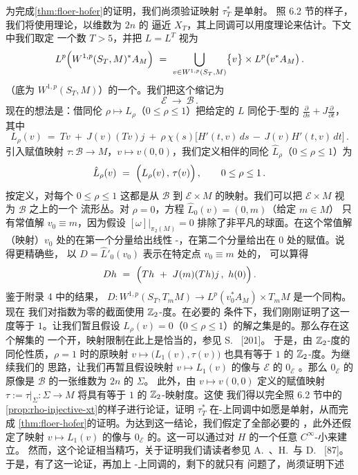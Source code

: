 为完成\cref{thm:floer-hofer}的证明，我们尚须验证映射 $\tau_{T}^{*}$ 是单射。%
照 6.2 节的样子，我们将使用\trFredholm{}理论，以维数为 $2n$ 的\trSmooth%
\trCompact\trManifold{}逼近 $X_{T}$，其上同调可以用度理论来估计。下文中我们取定%
一个数 $T>5$，并把\trOperator{} $L=L^{T}$ 视为\trBundle
\[
L^{p}\Bigl(W^{1,p}(S_{T},M)^{*}A_{M}\Bigr)\ =\ \bigcup_{v\in W^{1,p}(S_{T},M)}\bigl\{v\bigr\}\times L^{p}\bigl(v^{*}A_{M}\bigr)\,.
\]
（底为 $W^{1,p}(S_{T},M)$）的一个\trSmooth\trSection。我们把这个\trBundle{}缩记为
\[
\mathcal{E}\ \to\ \mathcal{B}\,.
\]
现在的想法是：借同伦 $\rho\mapsto L_{\rho}$（$0\leq\rho\leq1$）把给定的%
\trSection{} $L$ 同伦于\trCauchy-\trRiemann{}型的\trSection{}%
$\frac{\partial}{\partial s}+J\frac{\partial}{\partial t}$，其中
\[
L_{\rho}(v)\ =\ Tv\ +\ J(v)(Tv)j\ +\ \rho\,\chi(s)\bigl[H'(t,v)\,ds\,-\,J(v)H'(t,v)\,dt\bigr]\,.
\]
引入赋值映射 $\tau:\mathcal{B}\to M$，$v\mapsto v(0,0)$，我们定义相伴的同伦%
$\hat{L}_{\rho}$（$0\leq\rho\leq1$）为
\[
\hat{L}_{\rho}(v)\ =\ \Bigl(L_{\rho}(v)\,,\,\tau(v)\Bigr)\,,\qquad 0\leq\rho\leq1\,.
\]
按定义，对每个 $0\leq\rho\leq1$ 这都是从 $\mathcal{B}$ 到 $\mathcal{E}\times M$%
的映射。我们可以把 $\mathcal{E}\times M$ 视为 $\mathcal{B}$ 之上的一个%
\trBanach{}流形丛。对 $\rho=0$，方程 $\hat{L}_{0}(v)=(0,m)$（给定 $m\in M$）%
只有常值解 $v_{0}\equiv m$，因为假设 $[\omega]\big|_{\pi_{2}(M)}=0$%
排除了非平凡的\trHolomorphic{}球面。在这个常值解%
（映射）$v_{0}$ 处的\trLinearization{}在第一个分量给出线性%
\trCauchy-\trRiemann\trOperator，在第二个分量给出在 $0$ 处的赋值。说得更精确些，%
以 $D=\hat{L}'_{0}(v_{0})$ 表示在特定点 $v_{0}\equiv m$ 处的\trLinearization，%
可以算得
\[
Dh\ =\ \Bigl(Th\ +\ J(m)(Th)j\,,\ h(0)\Bigr)\,.
\]
鉴于附录 4 中的结果，\trOperator{}%
$D:W^{1,p}(S_{T},T_{m}M)\to L^{p}(v_{0}^{*}A_{M})\times T_{m}M$ 是一个同构。现在%
我们对\trFredholm{}指数为零的\trFredholm{}截面使用 $\mathbb{Z}_{2}$-度。在必要的%
\trCompactness{}条件下，我们刚刚证明了这一度等于 $1$。让我们暂且假设%
$L_{\rho}(v)=0$（$0\leq\rho\leq1$）的解之集是\trCompact{}的。那么存在这个解集的%
一个开\trNeighborhood，\trFredholm{}映射限制在此\trNeighborhood{}上是恰当的，参见 S.~\trSmale{} [201]。%
于是，由 $\mathbb{Z}_{2}$-度的同伦性质，$\rho=1$ 时的原映射%
$v\mapsto\bigl(L_{1}(v),\tau(v)\bigr)$ 也具有等于 $1$ 的 $\mathbb{Z}_{2}$-度。为继续我们的%
思路，让我们再暂且假设映射 $v\mapsto L_{1}(v)$ 的像与\trBundle{} $\mathcal{E}$ 的%
\trZeroSection{} $0_{\mathcal{E}}$ \trTransversal。那么 $0_{\mathcal{E}}$ 的原像是%
$\mathcal{B}$ 的一张维数为 $2n$ 的\trSmooth\trCompact\trSubmanifold{} $\Sigma$。%
此外，由 $v\mapsto v(0,0)$ 定义的赋值映射%
$\tau:=\tau\big|_{\Sigma}:\Sigma\to M$ 将具有等于 $1$ 的 $\mathbb{Z}_{2}$-映射度。这使%
我们得以完全照 6.2 节中的\cref{prop:rho-injective-xt}的样子进行论证，证明%
$\tau_{T}^{*}$ 在\trAlexander-\trSpanier{}上同调中如愿是单射，从而完成%
\cref{thm:floer-hofer}的证明。为达到这一结论，我们假定了全部必要的%
\trCompactness，此外还假定了映射 $v\mapsto L_{1}(v)$ 的像与\trZeroSection%
$0_{\mathcal{E}}$ 的\trTransversality。这一\trTransversality{}可以通过对%
\trHamiltonianFunction{} $H$ 的一个任意 $C^{\infty}$-小\trPerturbation{}来建立。%
然而，这个论证相当精巧，关于证明我们请读者参见 A.~\trFloer、H.~\trHofer{}与%
D.~\trSalamon{} [87]。于是，有了这一\trPerturbation{}论证，再加上%
\trAlexander-\trSpanier{}上同调的\trContinuity，剩下的就只有%
\trCompactness{}问题了，尚须证明下述

